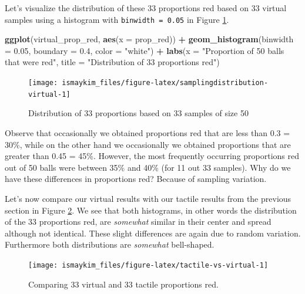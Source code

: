 \documentclass[12pt, krantz2,]{krantz}
\makeatletter
\newenvironment{Shaded}{\begin{snugshade}}{\end{snugshade}}
\newcommand{\DataTypeTok}[1]{\textcolor[rgb]{0.27,0.27,0.27}{#1}}
\newcommand{\FloatTok}[1]{\textcolor[rgb]{0.06,0.06,0.06}{#1}}
\newcommand{\KeywordTok}[1]{\textcolor[rgb]{0.27,0.27,0.27}{\textbf{#1}}}
\newcommand{\NormalTok}[1]{#1}
\newcommand{\OperatorTok}[1]{\textcolor[rgb]{0.43,0.43,0.43}{\textbf{#1}}}
\newcommand{\StringTok}[1]{\textcolor[rgb]{0.5,0.5,0.5}{#1}}
\newenvironment{kframe}{%
\medskip{}
\setlength{\fboxsep}{.8em}
 \def\at@end@of@kframe{}%
 \ifinner\ifhmode%
  \def\at@end@of@kframe{\end{minipage}}%
  \begin{minipage}{\columnwidth}%
 \fi\fi%
 \def\FrameCommand##1{\hskip\@totalleftmargin \hskip-\fboxsep
 \colorbox{shadecolor}{##1}\hskip-\fboxsep
     \hskip-\linewidth \hskip-\@totalleftmargin \hskip\columnwidth}%
 \MakeFramed {\advance\hsize-\width
   \@totalleftmargin\z@ \linewidth\hsize
   \@setminipage}}%
 {\par\unskip\endMakeFramed%
 \at@end@of@kframe}
\renewenvironment{Shaded}{\begin{kframe}}{\end{kframe}}
\makeatother
\begin{document}
Let's visualize the distribution of these 33 proportions red based on 33 virtual samples using a histogram with \texttt{binwidth\ =\ 0.05} in Figure \ref{fig:samplingdistribution-virtual}.

\begin{Shaded}
\begin{Highlighting}[]
\KeywordTok{ggplot}\NormalTok{(virtual_prop_red, }\KeywordTok{aes}\NormalTok{(}\DataTypeTok{x =}\NormalTok{ prop_red)) }\OperatorTok{+}
\StringTok{  }\KeywordTok{geom_histogram}\NormalTok{(}\DataTypeTok{binwidth =} \FloatTok{0.05}\NormalTok{, }\DataTypeTok{boundary =} \FloatTok{0.4}\NormalTok{, }\DataTypeTok{color =} \StringTok{"white"}\NormalTok{) }\OperatorTok{+}
\StringTok{  }\KeywordTok{labs}\NormalTok{(}\DataTypeTok{x =} \StringTok{"Proportion of 50 balls that were red"}\NormalTok{, }
       \DataTypeTok{title =} \StringTok{"Distribution of 33 proportions red"}\NormalTok{) }
\end{Highlighting}
\end{Shaded}

\begin{figure}

{\centering \texttt{[image: ismaykim\_files/figure-latex/samplingdistribution-virtual-1]} 

}

\caption{Distribution of 33 proportions based on 33 samples of size 50}\label{fig:samplingdistribution-virtual}
\end{figure}

Observe that occasionally we obtained proportions red that are less than 0.3 = 30\%, while on the other hand we occasionally we obtained proportions that are greater than 0.45 = 45\%. However, the most frequently occurring proportions red out of 50 balls were between 35\% and 40\% (for 11 out 33 samples). Why do we have these differences in proportions red? Because of sampling variation.

Let's now compare our virtual results with our tactile results from the previous section in Figure \ref{fig:tactile-vs-virtual}. We see that both histograms, in other words the distribution of the 33 proportions red, are \emph{somewhat} similar in their center and spread although not identical. These slight differences are again due to random variation. Furthermore both distributions are \emph{somewhat} bell-shaped.

\begin{figure}

{\centering \texttt{[image: ismaykim\_files/figure-latex/tactile-vs-virtual-1]} 

}

\caption{Comparing 33 virtual and 33 tactile proportions red.}\label{fig:tactile-vs-virtual}
\end{figure}
\end{document}
